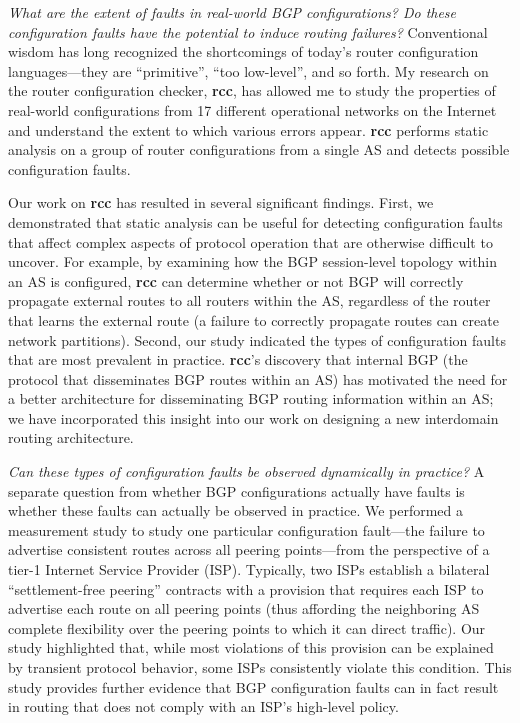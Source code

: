 {\em What are the extent of faults in real-world BGP configurations?  Do
  these configuration faults have the potential to induce routing
  failures?}  Conventional wisdom has long recognized the shortcomings
  of today's router configuration languages---they are ``primitive'',
  ``too low-level'', and so forth.  My research on the router
  configuration checker, {\bf rcc}, has allowed me to study the
  properties of real-world configurations from 17 different operational
  networks on the Internet and understand the extent to which various
  errors appear.  {\bf rcc} performs static analysis on a group of
  router configurations from a single AS and detects possible
  configuration faults.

  Our work on {\bf rcc} has resulted in several significant findings.
  First, we demonstrated that static analysis can be useful for
  detecting configuration faults that affect complex aspects of protocol
  operation that are otherwise difficult to uncover.  For example, by
  examining how the BGP session-level topology within an AS is
  configured, {\bf rcc} can determine whether or not BGP will correctly
  propagate external routes to all routers within the AS, regardless of
  the router that learns the external route (a failure to correctly
  propagate routes can create network partitions).  Second, our study
  indicated the types of configuration faults that are most prevalent in
  practice.  {\bf rcc}'s discovery that internal BGP (the protocol that
  disseminates BGP routes within an AS) has motivated the need for a
  better architecture for disseminating BGP routing information within
  an AS; we have incorporated this insight into our work on designing a
  new interdomain routing architecture.

{\em Can these types of configuration faults be observed dynamically in
  practice?}  A separate question from whether BGP configurations
  actually have faults is whether these faults can actually be observed
  in practice.  We performed a measurement study to study one particular
  configuration fault---the failure to advertise consistent routes
  across all peering points---from the perspective of a tier-1 Internet
  Service Provider (ISP).  Typically, two ISPs establish a bilateral
  ``settlement-free peering'' contracts with a provision that requires
  each ISP to advertise each route on all peering points (thus affording
  the neighboring AS complete flexibility over the peering points to
  which it can direct traffic).  Our study highlighted that, while most
  violations of this provision can be explained by transient protocol
  behavior, some ISPs consistently violate this condition.  This study
  provides further evidence that BGP configuration faults can in fact
  result in routing that does not comply with an ISP's high-level
  policy.

